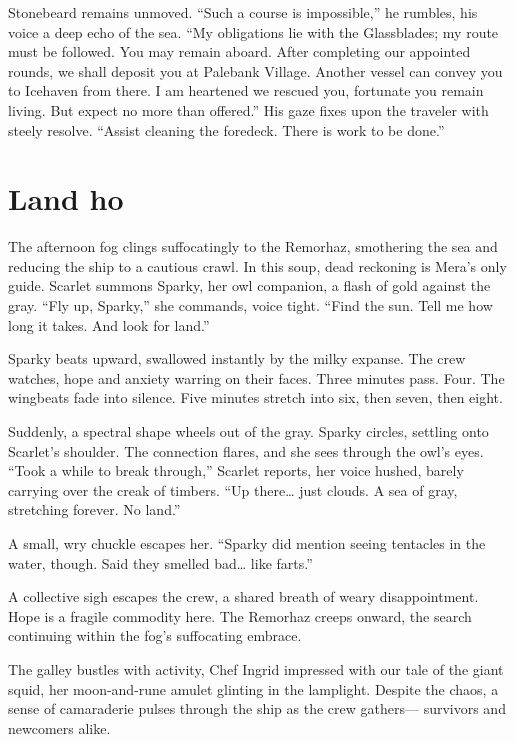 \documentclass[
  letterpaper,12pt,twoside,twocolumn,openany,
  nodeprecatedcode,bg=full]{dndbook}
\begin{document}
Stonebeard remains unmoved. ``Such a course is impossible,'' he rumbles,
his voice a deep echo of the sea. ``My obligations lie with the
Glassblades; my route must be followed. You may remain aboard. After
completing our appointed rounds, we shall deposit you at Palebank
Village. Another vessel can convey you to Icehaven from there. I am
heartened we rescued you, fortunate you remain living. But expect no
more than offered.'' His gaze fixes upon the traveler with steely
resolve. ``Assist cleaning the foredeck. There is work to be done.''

\section{Land ho}\label{land-ho}

The afternoon fog clings suffocatingly to the Remorhaz, smothering the
sea and reducing the ship to a cautious crawl. In this soup, dead
reckoning is Mera's only guide. Scarlet summons Sparky, her owl
companion, a flash of gold against the gray. ``Fly up, Sparky,'' she
commands, voice tight. ``Find the sun. Tell me how long it takes. And
look for land.''

Sparky beats upward, swallowed instantly by the milky expanse. The crew
watches, hope and anxiety warring on their faces. Three minutes pass.
Four. The wingbeats fade into silence. Five minutes stretch into six,
then seven, then eight.

Suddenly, a spectral shape wheels out of the gray. Sparky circles,
settling onto Scarlet's shoulder. The connection flares, and she sees
through the owl's eyes. ``Took a while to break through,'' Scarlet
reports, her voice hushed, barely carrying over the creak of timbers.
``Up there\ldots{} just clouds. A sea of gray, stretching forever. No
land.''

A small, wry chuckle escapes her. ``Sparky did mention seeing tentacles
in the water, though. Said they smelled bad\ldots{} like farts.''

A collective sigh escapes the crew, a shared breath of weary
disappointment. Hope is a fragile commodity here. The Remorhaz creeps
onward, the search continuing within the fog's suffocating embrace.

The galley bustles with activity, Chef Ingrid impressed with our tale of
the giant squid, her moon-and-rune amulet glinting in the lamplight.
Despite the chaos, a sense of camaraderie pulses through the ship as the
crew gathers--- survivors and newcomers alike.
\end{document}
